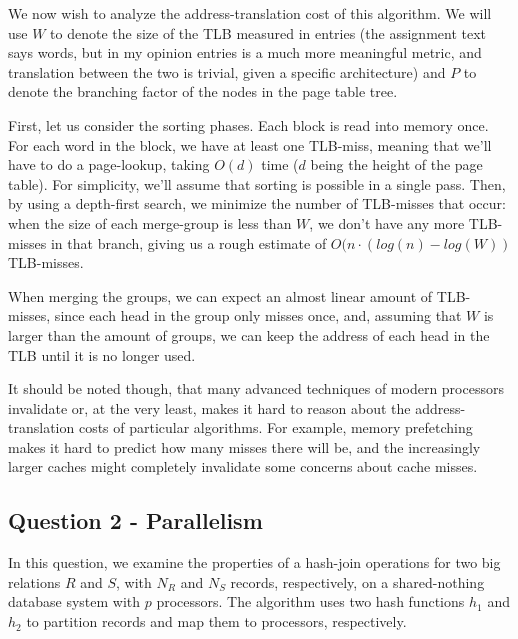 \documentclass[a4paper, 12pt]{article}
\begin{document}

We now wish to analyze the address-translation cost of this
algorithm. We will use $W$ to denote the size of the TLB measured in
entries (the assignment text says words, but in my opinion entries is
a much more meaningful metric, and translation between the two is
trivial, given a specific architecture) and $P$ to denote the
branching factor of the nodes in the page table tree.

First, let us consider the sorting phases. Each block is read into
memory once. For each word in the block, we have at least one
TLB-miss, meaning that we'll have to do a page-lookup, taking $O(d)$
time ($d$ being the height of the page table). For simplicity, we'll
assume that sorting is possible in a single pass. Then, by using a
depth-first search, we minimize the number of TLB-misses that occur:
when the size of each merge-group is less than $W$, we don't have any
more TLB-misses in that branch, giving us a rough estimate of
$O(n\cdot (log (n) - log(W))$ TLB-misses.

When merging the groups, we can expect an almost linear amount of
TLB-misses, since each head in the group only misses once, and,
assuming that $W$ is larger than the amount of groups, we can keep the
address of each head in the TLB until it is no longer used.

It should be noted though, that many advanced techniques of modern
processors invalidate or, at the very least, makes it hard to reason
about the address-translation costs of particular algorithms. For
example, memory prefetching makes it hard to predict how many misses
there will be, and the increasingly larger caches might completely
invalidate some concerns about cache misses.

\subsection*{Question 2 - Parallelism}

In this question, we examine the properties of a hash-join operations
for two big relations $R$ and $S$, with $N_R$ and $N_S$ records,
respectively, on a shared-nothing database system with $p$
processors. The algorithm uses two hash functions $h_1$ and $h_2$ to
partition records and map them to processors, respectively.
\end{document}
